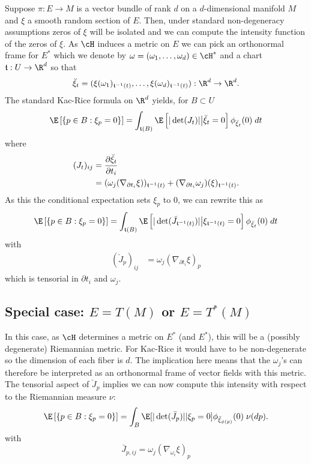 \documentclass{article}
\begin{document}
Suppose $\pi:E \to M$ is a vector bundle of rank $d$ on a $d$-dimensional manifold $M$ and $\xi$
a smooth random section of $E$. Then, under standard non-degeneracy assumptions zeros of $\xi$ will be isolated
and we can compute the intensity function of the zeros of $\xi$. As $\cH$ induces a metric on $E$ we can pick
an orthonormal frame for $E^*$ which we denote by $\omega=(\omega_1, \dots, \omega_d) \in \cH^*$ and a chart
$\coordchart:U \to \R^d$ so that
$$
\breve{\xi}_t = (\xi(\omega_1)_{\coordchart^{-1}(t)}, \dots, \xi(\omega_d)_{\coordchart^{-1}(t)}): \R^d \to \R^d.
$$
The standard Kac-Rice formula on $\R^d$ yields, for $B \subset U$
$$
\begin{aligned}
\E \left[\{p \in B: \xi_p=0\} \right] &= \int_{\coordchart(B)} \E\left[|\det(J_t)| \bigr | \breve{\xi}_t=0 \right] \phi_{\breve{\xi}_t}(0) \; dt \\
\end{aligned}
$$
where
$$
\begin{aligned}
  (J_t)_{ij} &= \frac{\partial \breve{\xi}_t}{\partial t_i} \\
  &= (\omega_j(\nabla_{\partial t_i}\xi))_{\mathfrak{t}^{-1}(t)} + (\nabla_{\partial t_i} \omega_j)(\xi)_{\mathfrak{t}^{-1}(t)}. \\
\end{aligned}
$$
As this the conditional expectation sets $\xi_p$ to 0, we can rewrite this as
$$
\begin{aligned}
\E \left[\{p \in B: \xi_p=0\} \right] &= \int_{\coordchart(B)} \E \left[|\det(\breve{J}_{\coordchart^{-1}(t)})| \bigr | \xi_{\coordchart^{-1}(t)}=0 \right] \phi_{\breve{\xi}_t}(0) \; dt \\
\end{aligned}
$$
with
$$
\begin{aligned}
  (\breve{J}_p)_{ij} &= \omega_j(\nabla_{\partial t_i}\xi)_{p}
\end{aligned}
$$
which is tensorial in $\partial t_i$ and $\omega_j$.

\subsection{Special case: $E=T(M)$ or $E=T^*(M)$}

In this case, as $\cH$ determines a metric on $E^*$ (and $E^*$), this will be a (possibly degenerate) Riemannian
metric. For Kac-Rice it would have to be non-degenerate so the dimension of each fiber is $d$. The implication
here means that the $\omega_j$'s can therefore be interpreted as an orthonormal frame of vector fields with
this metric. The tensorial aspect of $\breve{J}_p$ implies we can now compute this intensity
with respect to the Riemannian measure $\nu$:
$$
\begin{aligned}
\E \left[\{p \in B: \xi_p=0\} \right] &= \int_{B} \E[|\det(\bar{J}_p)| | \xi_p=0] \phi_{\breve{\xi}_{\phi(p)}}(0) \; \nu(dp). \\
\end{aligned}
$$
with
\begin{equation}
  \label{eq:jacobian}
\bar{J}_{p,ij} =  \omega_j(\nabla_{\omega_i}\xi)_{p}
\end{equation}
\end{document}
